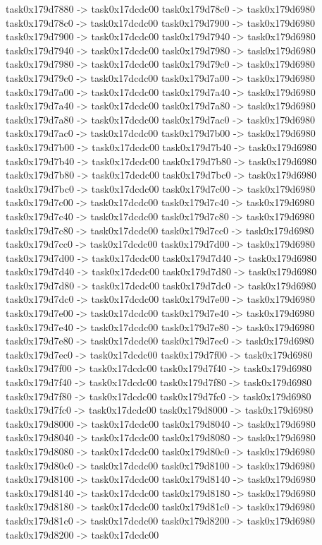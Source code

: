 {	task0x179d7880 -> task0x17dcdc00
	task0x179d78c0 -> task0x179d6980
	task0x179d78c0 -> task0x17dcdc00
	task0x179d7900 -> task0x179d6980
	task0x179d7900 -> task0x17dcdc00
	task0x179d7940 -> task0x179d6980
	task0x179d7940 -> task0x17dcdc00
	task0x179d7980 -> task0x179d6980
	task0x179d7980 -> task0x17dcdc00
	task0x179d79c0 -> task0x179d6980
	task0x179d79c0 -> task0x17dcdc00
	task0x179d7a00 -> task0x179d6980
	task0x179d7a00 -> task0x17dcdc00
	task0x179d7a40 -> task0x179d6980
	task0x179d7a40 -> task0x17dcdc00
	task0x179d7a80 -> task0x179d6980
	task0x179d7a80 -> task0x17dcdc00
	task0x179d7ac0 -> task0x179d6980
	task0x179d7ac0 -> task0x17dcdc00
	task0x179d7b00 -> task0x179d6980
	task0x179d7b00 -> task0x17dcdc00
	task0x179d7b40 -> task0x179d6980
	task0x179d7b40 -> task0x17dcdc00
	task0x179d7b80 -> task0x179d6980
	task0x179d7b80 -> task0x17dcdc00
	task0x179d7bc0 -> task0x179d6980
	task0x179d7bc0 -> task0x17dcdc00
	task0x179d7c00 -> task0x179d6980
	task0x179d7c00 -> task0x17dcdc00
	task0x179d7c40 -> task0x179d6980
	task0x179d7c40 -> task0x17dcdc00
	task0x179d7c80 -> task0x179d6980
	task0x179d7c80 -> task0x17dcdc00
	task0x179d7cc0 -> task0x179d6980
	task0x179d7cc0 -> task0x17dcdc00
	task0x179d7d00 -> task0x179d6980
	task0x179d7d00 -> task0x17dcdc00
	task0x179d7d40 -> task0x179d6980
	task0x179d7d40 -> task0x17dcdc00
	task0x179d7d80 -> task0x179d6980
	task0x179d7d80 -> task0x17dcdc00
	task0x179d7dc0 -> task0x179d6980
	task0x179d7dc0 -> task0x17dcdc00
	task0x179d7e00 -> task0x179d6980
	task0x179d7e00 -> task0x17dcdc00
	task0x179d7e40 -> task0x179d6980
	task0x179d7e40 -> task0x17dcdc00
	task0x179d7e80 -> task0x179d6980
	task0x179d7e80 -> task0x17dcdc00
	task0x179d7ec0 -> task0x179d6980
	task0x179d7ec0 -> task0x17dcdc00
	task0x179d7f00 -> task0x179d6980
	task0x179d7f00 -> task0x17dcdc00
	task0x179d7f40 -> task0x179d6980
	task0x179d7f40 -> task0x17dcdc00
	task0x179d7f80 -> task0x179d6980
	task0x179d7f80 -> task0x17dcdc00
	task0x179d7fc0 -> task0x179d6980
	task0x179d7fc0 -> task0x17dcdc00
	task0x179d8000 -> task0x179d6980
	task0x179d8000 -> task0x17dcdc00
	task0x179d8040 -> task0x179d6980
	task0x179d8040 -> task0x17dcdc00
	task0x179d8080 -> task0x179d6980
	task0x179d8080 -> task0x17dcdc00
	task0x179d80c0 -> task0x179d6980
	task0x179d80c0 -> task0x17dcdc00
	task0x179d8100 -> task0x179d6980
	task0x179d8100 -> task0x17dcdc00
	task0x179d8140 -> task0x179d6980
	task0x179d8140 -> task0x17dcdc00
	task0x179d8180 -> task0x179d6980
	task0x179d8180 -> task0x17dcdc00
	task0x179d81c0 -> task0x179d6980
	task0x179d81c0 -> task0x17dcdc00
	task0x179d8200 -> task0x179d6980
	task0x179d8200 -> task0x17dcdc00
}
